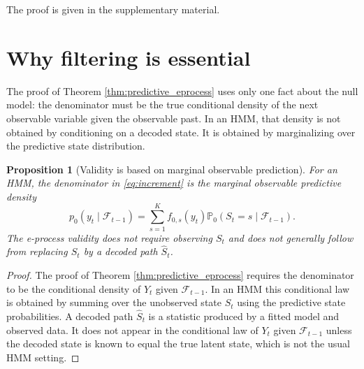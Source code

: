 \documentclass[pdflatex,sn-basic]{sn-jnl}
\theoremstyle{thmstyleone}
\newtheorem{proposition}[theorem]{Proposition}
\theoremstyle{thmstyletwo}
\theoremstyle{thmstylethree}
\newcommand{\Pbb}{\mathbb P}
\newcommand{\1}{\mathbf 1}
\newcommand{\calF}{\mathcal F}
\begin{document}
\noindent The proof is given in the supplementary material.

\section{Why filtering is essential}
\label{sec:filtering_essential}

The proof of Theorem \ref{thm:predictive_eprocess} uses only one fact about the null model: the denominator must be the true conditional density of the next observable variable given the observable past. In an HMM, that density is not obtained by conditioning on a decoded state. It is obtained by marginalizing over the predictive state distribution.

\begin{proposition}[Validity is based on marginal observable prediction]
\label{prop:latent_filtering}
For an HMM, the denominator in \eqref{eq:increment} is the marginal observable predictive density
\begin{equation}
\label{eq:marginal_prediction}
 p_0(y_t\mid\calF_{t-1})=\sum_{s=1}^K f_{0,s}(y_t)\Pbb_0(S_t=s\mid\calF_{t-1}).
\end{equation}
The e-process validity does not require observing $S_t$ and does not generally follow from replacing $S_t$ by a decoded path $\widehat S_t$.
\end{proposition}

\begin{proof}
The proof of Theorem \ref{thm:predictive_eprocess} requires the denominator to be the conditional density of $Y_t$ given $\calF_{t-1}$. In an HMM this conditional law is obtained by summing over the unobserved state $S_t$ using the predictive state probabilities. A decoded path $\widehat S_t$ is a statistic produced by a fitted model and observed data. It does not appear in the conditional law of $Y_t$ given $\calF_{t-1}$ unless the decoded state is known to equal the true latent state, which is not the usual HMM setting.
\end{proof}
\end{document}
